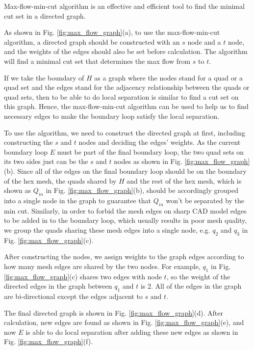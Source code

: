 \documentclass[final,5p,times,twocolumn]{elsarticle}
\begin{document}
Max-flow-min-cut algorithm is an effective and efficient tool to find the minimal cut set in a directed graph\cite{lawler20014}. 

As shown in Fig. \ref{fig:max_flow_graph}(a), to use the max-flow-min-cut algorithm, a directed graph should be constructed with an $s$ node and a $t$ node, and the weights of the edges should also be set before calculation. The algorithm will find a minimal cut set that determines the max flow from $s$ to $t$.

If we take the boundary of $H$ as a graph where the nodes stand for a quad or a quad set and the edges stand for the adjacency relationship between the quads or quad sets, then to be able to do local separation is similar to find a cut set on this graph. Hence, the max-flow-min-cut algorithm can be used to help us to find necessary edges to make the boundary loop satisfy the local separation.

To use the algorithm, we need to construct the directed graph at first, including constructing the $s$ and $t$ nodes and deciding the edges' weights. As the current boundary loop $E$ must be part of the final boundary loop, the two quad sets on its two sides just can be the $s$ and $t$ nodes as shown in Fig. \ref{fig:max_flow_graph}(b). Since all of the edges on the final boundary loop should be on the boundary of the hex mesh, the quads shared by $H$ and the rest of the hex mesh, which is shown as $Q_{in}$ in Fig. \ref{fig:max_flow_graph}(b), should be accordingly grouped into a single node in the graph to guarantee that $Q_{in}$ won't be separated by the min cut. Similarly, in order to forbid the mesh edges on sharp CAD model edges to be added in to the boundary loop, which usually results in poor mesh quality, we group the quads sharing these mesh edges into a single node, e.g. $q_2$ and $q_3$ in Fig. \ref{fig:max_flow_graph}(c).

After constructing the nodes, we assign weights to the graph edges according to how many mesh edges are shared by the two nodes. For example, $q_1$ in Fig. \ref{fig:max_flow_graph}(c) shares two edges with node $t$, so the weight of the directed edges in the graph between $q_1$ and $t$ is 2. All of the edges in the graph are bi-directional except the edges adjacent to $s$ and $t$.

The final directed graph is shown in Fig. \ref{fig:max_flow_graph}(d). After calculation, new edges are found as shown in Fig. \ref{fig:max_flow_graph}(e), and now $E$ is able to do local separation after adding these new edges as shown in  Fig. \ref{fig:max_flow_graph}(f).
\end{document}
